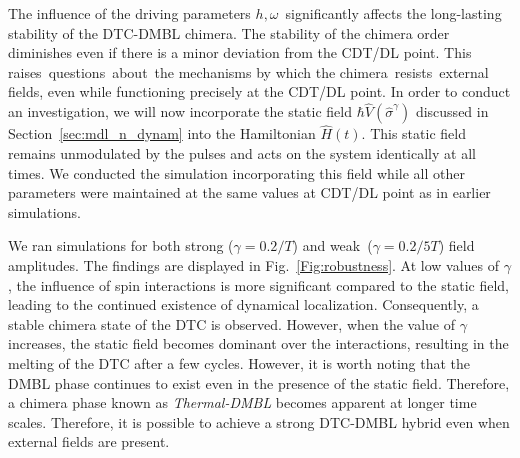 \documentclass[12pt]{iopart}
\begin{document}
The influence of the driving parameters $h, \omega$ significantly affects the long-lasting stability of the DTC-DMBL chimera. The stability of the chimera order diminishes even if there is a minor deviation from the CDT/DL point. This raises questions about the mechanisms by which the chimera resists external fields, even while functioning precisely at the CDT/DL point.
In order to conduct an investigation, we will now incorporate the static field $\hbar\hat{V}(\hat{\sigma}^{\gamma})$ discussed in Section~\ref{sec:mdl_n_dynam} into the Hamiltonian $\hat{H}(t)$. This static field remains unmodulated by the pulses and acts on the system identically at all times. We conducted the simulation incorporating this field while all other parameters were maintained at the same values at CDT/DL point as in earlier simulations. 

We ran simulations for both strong ($\gamma=0.2/T$) and weak ($ \gamma= 0.2/5T$) field amplitudes. The findings are displayed in Fig.~\ref{Fig:robustness}. At low values of $\gamma$, the influence of spin interactions is more significant compared to the static field, leading to the continued existence of dynamical localization. Consequently, a stable chimera state of the DTC is observed. However, when the value of $\gamma$ increases, the static field becomes dominant over the interactions, resulting in the melting of the DTC after a few cycles. However, it is worth noting that the DMBL phase continues to exist even in the presence of the static field. Therefore, a chimera phase known as \textit{Thermal-DMBL} becomes apparent at longer time scales. Therefore, it is possible to achieve a strong DTC-DMBL hybrid even when external fields are present.
	
\end{document}
